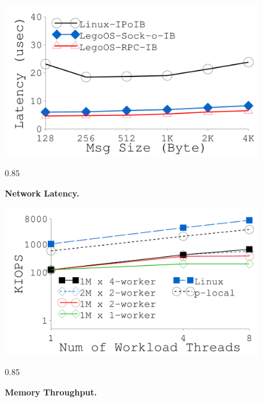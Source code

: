 \documentclass[10pt,times,twocolumn]{z2-article}
\renewcommand{\em}{\it}
\newcommand{\beforecaption}{\vspace{-.15cm}\begin{spacing}{0.85}}
\newcommand{\aftercaption}{\vspace{-.45cm}\end{spacing}}
\newcommand{\mycaption}[3]{\beforecaption\caption{\label{#1}{\bf\footnotesize #2} \em\scriptsize #3}\aftercaption}
\providecommand{\DIFaddbegin}{} %
\newcommand{\DIFaddincludegraphics}[2][]{{\color{blue}\fbox{\DIFOincludegraphics[#1]{#2}}}} %
\DeclareRobustCommand{\DIFaddbegin}{\DIFOaddbegin \let\includegraphics\DIFaddincludegraphics} %
\begin{document}
{{{{{{{\DIFaddbegin {
\begin{figure}[th]
\begin{minipage}{0.50\columnwidth}
\begin{center}
\centerline{\includegraphics[width=1.0\columnwidth]{Figures/g_plot_LEGO_latency.pdf}}
\vspace{-0.1in}
\mycaption{fig-net-latency}{Network Latency.}
{
}
\end{center}
\end{minipage}
\begin{minipage}{0.50\columnwidth}
\vspace{0.13in}
\begin{center}
\centerline{\includegraphics[width=1.0\columnwidth]{Figures/g_plot_LEGO_iops_memory.pdf}}
\vspace{-0.1in}
\mycaption{fig-iops-memory}{Memory Throughput.}
{
}
\end{center}
\end{minipage}
\begin{minipage}{0.50\columnwidth}

\end{minipage}
\end{figure}}}}}}}}}
\end{document}

